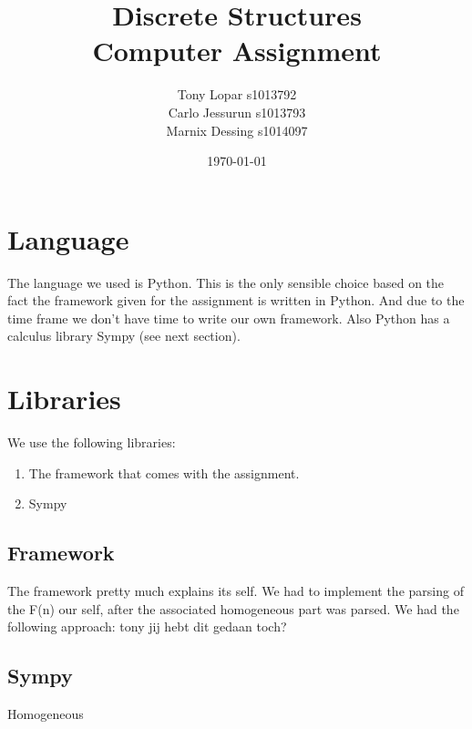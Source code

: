 \documentclass{article}
\begin{document}
\title{Discrete Structures \\ Computer Assignment}
\date{\today}
\author{Tony Lopar s1013792 \\ Carlo Jessurun s1013793 \\ Marnix Dessing s1014097}
\maketitle

\section{Language}
The language we used is Python. This is the only sensible choice based on the fact the framework given for the assignment is written in Python. And due to the time frame we don't have time to write our own framework. Also Python has a calculus library Sympy (see next section).

\section{Libraries}
We use the following libraries:
\begin{enumerate}
    \item The framework that comes with the assignment.
    \item Sympy
\end{enumerate}

\subsection{Framework}
The framework pretty much explains its self. 
We had to implement the parsing of the F(n) our self, after the associated homogeneous part was parsed. We had the following approach: tony jij hebt dit gedaan toch? 


\newpage

\subsection{Sympy}
Homogeneous
\end{document}
